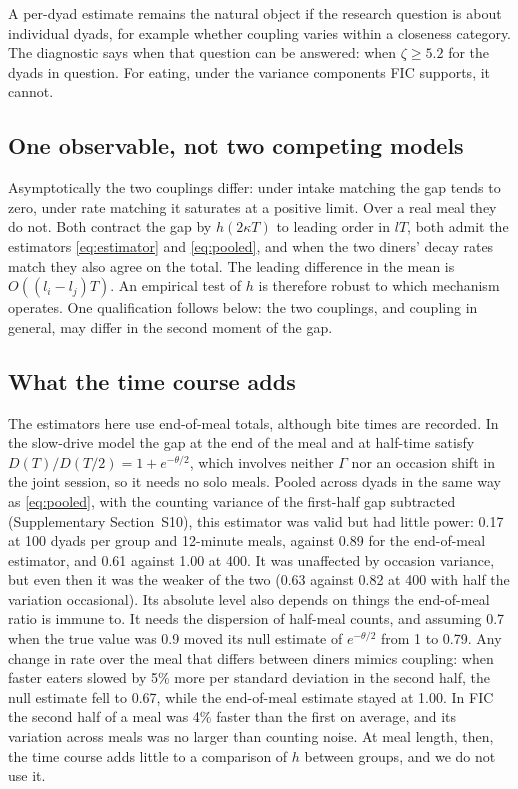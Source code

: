 \documentclass[12pt]{article}
\begin{document}
A per-dyad estimate remains the natural object if the research question is about
individual dyads, for example whether coupling varies within a closeness category.
The diagnostic says when that question can be answered: when $\zeta\geq5.2$ for
the dyads in question. For eating, under the variance components FIC supports, it
cannot.

\subsection*{One observable, not two competing models}

Asymptotically the two couplings differ: under intake matching the gap tends to
zero, under rate matching it saturates at a positive limit. Over a real meal they
do not. Both contract the gap by $h(2\kappa T)$ to leading order in $lT$, both admit
the estimators \eqref{eq:estimator} and \eqref{eq:pooled}, and when the two diners'
decay rates match they also agree on the total. The leading difference in the mean
is $O((l_i-l_j)T)$. An empirical test of $h$ is therefore robust to which mechanism
operates. One qualification follows below: the two couplings, and coupling in
general, may differ in the second moment of the gap.

\subsection*{What the time course adds}

The estimators here use end-of-meal totals, although bite times are recorded. In
the slow-drive model the gap at the end of the meal and at half-time satisfy
$D(T)/D(T/2)=1+e^{-\theta/2}$, which involves neither $\Gamma$ nor an occasion
shift in the joint session, so it needs no solo meals. Pooled across dyads in the
same way as \eqref{eq:pooled}, with the counting variance of the first-half gap
subtracted (Supplementary Section~S10), this estimator was valid but had little
power: 0.17 at 100 dyads per group and 12-minute meals, against 0.89 for the
end-of-meal estimator, and 0.61 against 1.00 at 400. It was unaffected by occasion
variance, but even then it was the weaker of the two (0.63 against 0.82 at 400 with
half the variation occasional). Its absolute level also depends on things the
end-of-meal ratio is immune to. It needs the dispersion of half-meal counts, and
assuming 0.7 when the true value was 0.9 moved its null estimate of
$e^{-\theta/2}$ from 1 to 0.79. Any change in rate over the meal that differs
between diners mimics coupling: when faster eaters slowed by 5\% more per standard
deviation in the second half, the null estimate fell to 0.67, while the end-of-meal
estimate stayed at 1.00. In FIC the second half of a meal was 4\% faster than the
first on average, and its variation across meals was no larger than counting noise.
At meal length, then, the time course adds little to a comparison of $h$ between
groups, and we do not use it.
\end{document}
